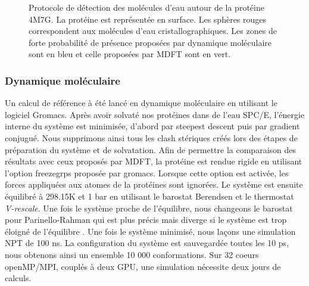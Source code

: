 \begin{figure}[H]
      \caption[Protocole de détection des molécules d'eau autour de la protéine 4M7G.]{Protocole de détection des molécules d'eau autour de la protéine 4M7G. La protéine est représentée en surface. Les sphères rouges correspondent aux molécules d'eau cristallographiques. Les zones de forte probabilité de présence proposées par dynamique moléculaire sont en bleu et celle proposées par MDFT sont en vert.}
      \label{fig:water_molecule_protocol}
\end{figure}




\subsubsection{Dynamique moléculaire}
Un calcul de référence à été lancé en dynamique moléculaire en utilisant le logiciel Gromacs\cite{berendsen_gromacs:_1995}. Après avoir solvaté nos protéines dans de l'eau SPC/E, l'énergie interne du système est minimisée, d'abord par steepest descent puis par gradient conjugué. Nous supprimons ainsi tous les clash stériques créés lors des étapes de préparation du système et de solvatation. Afin de permettre la comparaison des résultats avec ceux proposés par MDFT, la protéine est rendue rigide en utilisant l'option freezegrps proposée par gromacs. Lorsque cette option est activée, les forces appliquées aux atomes de la protéines sont ignorées. Le système est ensuite équilibré à 298.15K et 1 bar en utilisant le barostat Berendsen et le thermostat \textit{V-rescale}. Une fois le système proche de l'équilibre, nous changeons le barostat pour Parinello-Rahman qui est plus précis mais diverge si le système est trop éloigné de l'équilibre . Une fois le système minimisé, nous laçons une simulation NPT de 100 ns. La configuration du système est sauvegardée toutes les 10 ps, nous obtenons ainsi un ensemble 10 000 conformations. Sur 32 coeurs openMP/MPI, couplés à deux GPU, une simulation nécessite deux jours de calculs.

